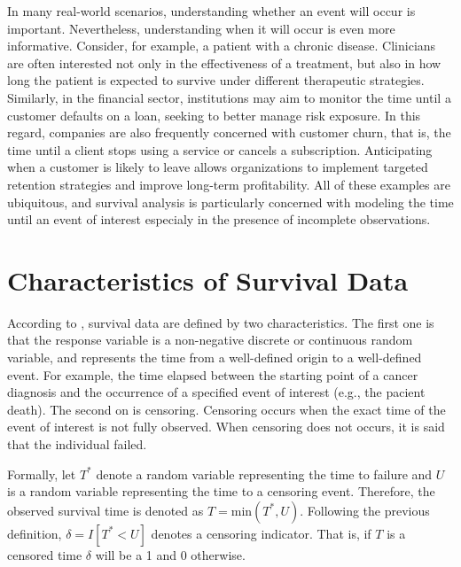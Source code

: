 \noindent In many real-world scenarios, understanding whether an event will
occur is important. Nevertheless, understanding when it will occur
is even more informative. Consider, for example, a patient with a
chronic disease. Clinicians are often interested not only in the
effectiveness of a treatment, but also in how long the patient is
expected to survive under different therapeutic strategies. Similarly,
in the financial sector, institutions may aim to monitor the time until
a customer defaults on a loan, seeking to better manage risk exposure.
In this regard, companies are also frequently concerned with customer
churn, that is, the time until a client stops using a service or cancels
a subscription. Anticipating when a customer is likely to leave allows
organizations to implement targeted retention strategies and improve
long-term profitability. All of these examples are ubiquitous, and
survival analysis is particularly concerned with modeling the time
until an event of interest especialy in the presence of incomplete
observations.

\section{Characteristics of Survival Data}

According to , survival data are defined by two
characteristics. The first one is that the response variable is a non-negative discrete
or continuous random variable, and represents the time from a well-defined origin to a
well-defined event. For example, the time elapsed between the starting point of a cancer
diagnosis and the occurrence of a specified event of interest (e.g., the pacient death).
The second on is censoring. Censoring occurs when the exact time of the event of interest
is not fully observed. When censoring does not occurs, it is said that the individual
failed.

Formally, let $T^*$ denote a random variable representing the time to failure and $U$ is
a random variable representing the time to a censoring event. Therefore, the observed
survival time is denoted as $T=\text{min}\left(T^*, U\right)$. Following the previous
definition, $\delta = I\left[T^* < U\right]$ denotes a censoring indicator. That is,
if $T$ is a censored time $\delta$ will be a 1 and 0 otherwise.




